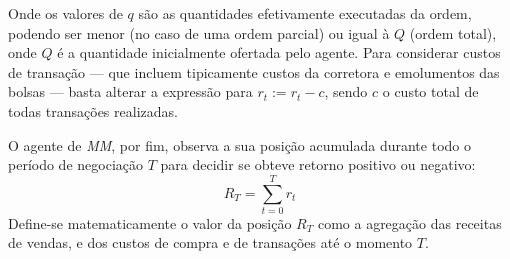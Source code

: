 Onde os valores de  $q$ são as quantidades efetivamente executadas da ordem, podendo ser menor (no caso de uma ordem parcial) ou igual à $Q$ (ordem total), onde $Q$ é a quantidade inicialmente ofertada pelo agente.
Para considerar custos de transação — que incluem tipicamente custos da corretora e emolumentos das bolsas — basta alterar a expressão para $r_{t} := r_{t} - c$, sendo $c$ o custo total de todas transações realizadas.

O agente de \textit{MM}, por fim, observa a sua posição acumulada durante todo o período de negociação $T$ para decidir se obteve retorno positivo ou negativo:
\begin{equation} \label{return_accumulated}
    R_{T} = \sum_{t=0}^{T} r_t
\end{equation}
Define-se matematicamente o valor da posição $R_T$ como a agregação das receitas de vendas, e dos custos de compra e de transações até o momento $T$. 
